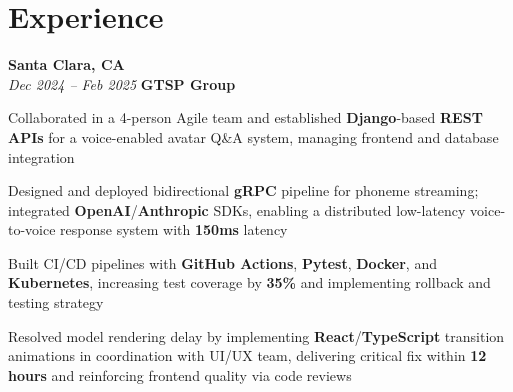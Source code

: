\section{Experience}

\begin{twocolentry}{
    \textbf{Santa Clara, CA} \\
    \textit{Dec 2024 – Feb 2025}
}{
    \textbf{GTSP Group} \\
}
\end{twocolentry}
\begin{onecolentry}
    \begin{highlights}
        \item Collaborated in a 4-person Agile team and established \textbf{Django}-based \textbf{REST APIs} for a voice-enabled avatar Q\&A system, managing frontend and database integration
        \item Designed and deployed bidirectional \textbf{gRPC} pipeline for phoneme streaming; integrated \textbf{OpenAI}/\textbf{Anthropic} SDKs, enabling a distributed low-latency voice-to-voice response system with \textbf{150ms} latency
        \item Built CI/CD pipelines with \textbf{GitHub Actions}, \textbf{Pytest}, \textbf{Docker}, and \textbf{Kubernetes}, increasing test coverage by \textbf{35\%} and implementing rollback and testing strategy
        \item Resolved model rendering delay by implementing \textbf{React}/\textbf{TypeScript} transition animations in coordination with UI/UX team, delivering critical fix within \textbf{12 hours} and reinforcing frontend quality via code reviews
    \end{highlights}
\end{onecolentry}

\vspace{0.2cm}

